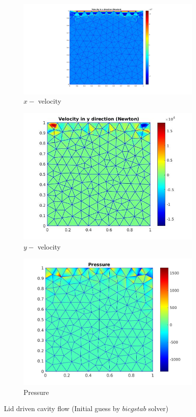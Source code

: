 \documentclass[a4paper,twoside,openright]{book}
\begin{document}
\begin{figure}
  \begin{subfigure}{\textwidth}
    \includegraphics[width=0.8\linewidth]{lid_newton_vx_bicgstab.jpg}
    \caption{$x-$ velocity}
  \label{x_vel_navier_stoke_bicgstab_lid}
  \end{subfigure}
  \begin{subfigure}{\textwidth}
    \includegraphics[width=0.8\linewidth]{lid_newton_vy_bicgstab.jpg}
    \caption{$y-$ velocity}
  \label{y_vel_navier_stoke_bicgstab_lid}
  \end{subfigure}
  \begin{subfigure}{\textwidth}
    \includegraphics[width=0.8\linewidth]{lid_newton_pressure_bicgstab.jpg}
    \caption{Pressure}
  \label{pressure_navier_stoke_bicgstab_lid}
  \end{subfigure}
\caption{Lid driven cavity flow (Initial guess by $bicgstab$ solver)}
\label{lid_driven_cavity_n_s_bicgstab}
\end{figure}
\end{document}
